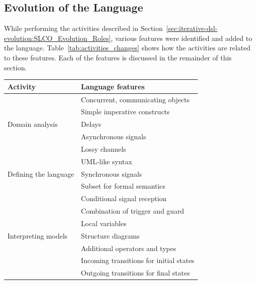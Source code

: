 \subsection{Evolution of the Language}
\label{subsec:iterative-dsl-evolution:evolution}
While performing the activities described in Section~\ref{sec:iterative-dsl-evolution:SLCO_Evolution_Roles}, various features were identified and added to the language.
Table~\ref{tab:activities_changes} shows how the activities are related to these features.
Each of the features is discussed in the remainder of this section.

\begin{table}[hbt]
\centering
\small
\begin{tabular}{|l|l|}
\hline
\rowcolor[gray]{.9}
\textbf{Activity}                          & \textbf{Language features} \\
\hline
\multirow{5}{*}{Domain analysis}           & Concurrent, communicating objects \\
                                           & Simple imperative constructs \\
                                           & Delays \\
                                           & Asynchronous signals \\
                                           & Lossy channels \\
\hline
\multirow{3}{*}{Defining the language}     & UML-like syntax \\
                                           & Synchronous signals \\
                                           & Subset for formal semantics \\
\hline
\multirow{8}{*}{Interpreting models}       & Conditional signal reception \\
                                           & Combination of trigger and guard \\
                                           & Local variables \\
                                           & Structure diagrams \\
                                           & Additional operators and types \\
                                           & Incoming transitions for initial states \\
                                           & Outgoing transitions for final states \\

\end{tabular}
\end{table}
